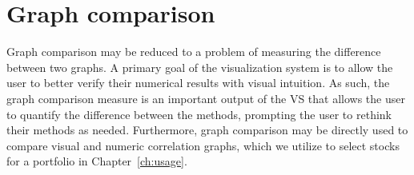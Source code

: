 \chapter{Graph comparison \label{ch:gc}}

Graph comparison may be reduced to a problem of measuring the difference 
between two graphs. 
A primary goal of the visualization system is to allow the user to better 
verify their numerical results with visual intuition. As such, the graph 
comparison measure is an important output of the VS that allows the user to 
quantify the difference between the methods, prompting the user to rethink 
their methods as needed. Furthermore, graph comparison may be directly used to 
compare visual and numeric correlation graphs, which we utilize to select 
stocks for a portfolio in Chapter~\ref{ch:usage}.



